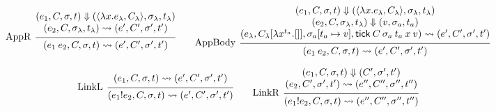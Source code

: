 \documentclass{article}
\theoremstyle{definition}
\newcommand*{\link}[2]{{#1}\mathtt{!}{#2}}
\newcommand*{\tick}{\mathsf{tick}}
\begin{document}
\[
  \begin{prooftree}
    \hypo{
      \begin{matrix}
        (e_{1}, C, \sigma, t)
        \Downarrow
        (\langle\lambda x.e_{\lambda}, C_{\lambda}\rangle, \sigma_{\lambda}, t_{\lambda}) \\
        (e_{2}, C, \sigma_{\lambda}, t_{\lambda})
        \rightsquigarrow
        (e', C', \sigma', t')
      \end{matrix}
    }
    \infer[left label={AppR}]1{
    (e_{1}\:e_{2}, C, \sigma, t)
    \rightsquigarrow
    (e', C', \sigma',t')
    }
  \end{prooftree}\qquad
  \begin{prooftree}
    \hypo{
      \begin{matrix}
        (e_{1}, C, \sigma, t)
        \Downarrow
        (\langle\lambda x.e_{\lambda}, C_{\lambda}\rangle, \sigma_{\lambda}, t_{\lambda}) \\
        (e_{2}, C, \sigma_{\lambda}, t_{\lambda})
        \Downarrow
        (v, \sigma_{a}, t_{a})                                                            \\
        (e_{\lambda}, C_{\lambda}[\lambda x^{t_{a}}.[]], \sigma_{a}[t_{a}\mapsto v], \tick\:C\:\sigma_{a}\:t_{a}\:x\:v)
        \rightsquigarrow
        (e', C', \sigma',t')
      \end{matrix}
    }
    \infer[left label={AppBody}]1{
    (e_{1}\:e_{2}, C, \sigma, t)
    \rightsquigarrow
    (e', C', \sigma',t')
    }
  \end{prooftree}
\]

\[
  \begin{prooftree}
    \hypo{
      \begin{matrix}
        (e_{1}, C, \sigma, t)
        \rightsquigarrow
        (e', C', \sigma', t')
      \end{matrix}
    }
    \infer[left label=LinkL]1{
    (\link{e_{1}}{e_{2}}, C, \sigma, t)
    \rightsquigarrow
    (e', C', \sigma', t')
    }
  \end{prooftree}\qquad
  \begin{prooftree}
    \hypo{
      \begin{matrix}
        (e_{1}, C, \sigma, t)
        \Downarrow
        (C', \sigma', t') \\
        (e_{2}, C', \sigma', t')
        \rightsquigarrow
        (e'', C'', \sigma'', t'')
      \end{matrix}
    }
    \infer[left label=LinkR]1{
    (\link{e_{1}}{e_{2}}, C, \sigma, t)
    \rightsquigarrow
    (e'', C'', \sigma'', t'')
    }
  \end{prooftree}
\]
\end{document}
